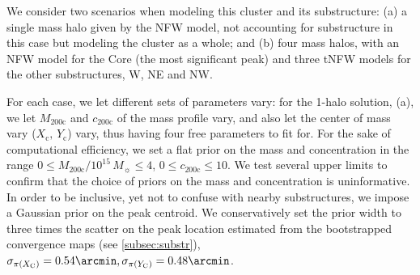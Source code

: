 \documentclass[iop,twocolumn]{emulateapj}
\def\munit{\mbox{$10^{15}\,M_\sun$}}
\begin{document}
We consider two scenarios when modeling this cluster and its substructure: (a) a single mass halo given by the NFW model, not accounting for substructure in this case but modeling the cluster as a whole; 
and (b) four mass halos, with an NFW model for the Core (the most significant peak) and three tNFW models for the other substructures, W, NE and NW. 

For each case, we let different sets of parameters vary: for the 1-halo
solution, (a), we let $M_\mathrm{200c}$ and $c_\mathrm{200c}$ of the mass
profile vary, and also let the center of mass vary ($X_\mathrm{c}, \,Y_\mathrm{c}$) vary, thus having four free parameters to fit for. For the sake of computational efficiency, we set a flat prior on the mass and concentration in the range $0\le M_\mathrm{200c}/\munit\le4$, $0\le c_\mathrm{200c}\le10$.
We test several upper limits to confirm that the choice of priors on the mass and concentration is uninformative. 
In order to be inclusive, yet not to confuse with nearby substructures, we impose a Gaussian prior on the peak centroid. We conservatively set the prior width to three times the scatter on the peak location estimated from the bootstrapped convergence maps (see \autoref{subsec:substr}), $\sigma_{\pi(X_\mathrm{C})}= 0.54\arcmin,\sigma_{\pi(Y_\mathrm{C})}= 0.48\arcmin$.
\end{document}

